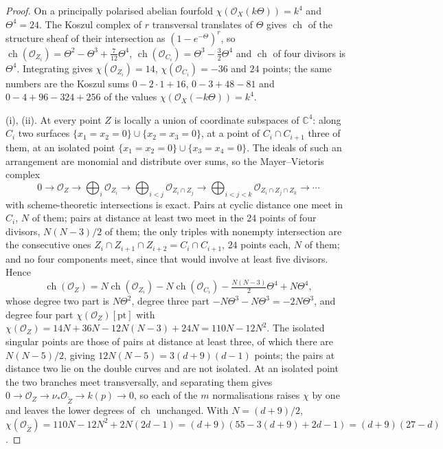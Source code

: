 \documentclass[11pt,reqno]{amsart}
\theoremstyle{plain}
\theoremstyle{definition}
\theoremstyle{remark}
\newcommand{\CC}{\mathbb{C}}
\newcommand{\cO}{\mathcal{O}}
\DeclareMathOperator{\ch}{ch}
\begin{document}
\begin{proof}
On a principally polarised abelian fourfold $\chi(\cO_{X}(k\Theta))=k^{4}$
and $\Theta^{4}=24$. The Koszul complex of $r$ transversal translates of
$\Theta$ gives $\ch$ of the structure sheaf of their intersection as
$(1-e^{-\Theta})^{r}$, so $\ch(\cO_{Z_{i}})=\Theta^{2}-\Theta^{3}+\tfrac{7}{12}\Theta^{4}$,
$\ch(\cO_{C_{i}})=\Theta^{3}-\tfrac32\Theta^{4}$ and $\ch$ of four divisors
is $\Theta^{4}$. Integrating gives $\chi(\cO_{Z_{i}})=14$,
$\chi(\cO_{C_{i}})=-36$ and $24$ points; the same numbers are the Koszul sums
$0-2\cdot1+16$, $0-3+48-81$ and $0-4+96-324+256$ of the values
$\chi(\cO_{X}(-k\Theta))=k^{4}$.

(i), (ii). At every point $Z$ is locally a union of coordinate subspaces of
$\CC^{4}$: along $C_{i}$ two surfaces $\{x_{1}=x_{2}=0\}\cup\{x_{2}=x_{3}=0\}$,
at a point of $C_{i}\cap C_{i+1}$ three of them, at an isolated point
$\{x_{1}=x_{2}=0\}\cup\{x_{3}=x_{4}=0\}$. The ideals of such an arrangement
are monomial and distribute over sums, so the Mayer--Vietoris complex
\[
  0\to\cO_{Z}\to\bigoplus_{i}\cO_{Z_{i}}\to\bigoplus_{i<j}\cO_{Z_{i}\cap Z_{j}}
  \to\bigoplus_{i<j<k}\cO_{Z_{i}\cap Z_{j}\cap Z_{k}}\to\cdots
\]
with scheme-theoretic intersections is exact. Pairs at cyclic distance one
meet in $C_{i}$, $N$ of them; pairs at distance at least two meet in the $24$
points of four divisors, $N(N-3)/2$ of them; the only triples with nonempty
intersection are the consecutive ones $Z_{i}\cap Z_{i+1}\cap Z_{i+2}=C_{i}\cap C_{i+1}$,
$24$ points each, $N$ of them; and no four components meet, since that would
involve at least five divisors. Hence
\[
  \ch(\cO_{Z})=N\ch(\cO_{Z_{i}})-N\ch(\cO_{C_{i}})-\tfrac{N(N-3)}{2}\Theta^{4}+N\Theta^{4},
\]
whose degree two part is $N\Theta^{2}$, degree three part
$-N\Theta^{3}-N\Theta^{3}=-2N\Theta^{3}$, and degree four part
$\chi(\cO_{Z})[\mathrm{pt}]$ with $\chi(\cO_{Z})=14N+36N-12N(N-3)+24N=110N-12N^{2}$.
The isolated singular points are those of pairs at distance at least three,
of which there are $N(N-5)/2$, giving $12N(N-5)=3(d+9)(d-1)$ points; the
pairs at distance two lie on the double curves and are not isolated. At an
isolated point the two branches meet transversally, and separating them
gives $0\to\cO_{Z}\to\nu_{*}\cO_{\widetilde Z}\to k(p)\to0$, so each of the
$m$ normalisations raises $\chi$ by one and leaves the lower degrees of
$\ch$ unchanged. With $N=(d+9)/2$,
$\chi(\cO_{\widetilde Z})=110N-12N^{2}+2N(2d-1)=(d+9)(55-3(d+9)+2d-1)=(d+9)(27-d)$.


\end{proof}
\end{document}
